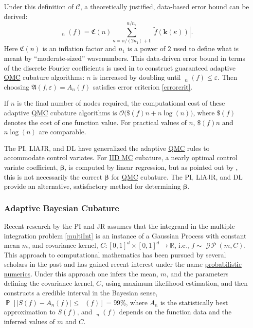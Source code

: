 \documentclass[11pt]{NSFamsart}
\newcommand{\QMC}{\hyperlink{QMClink}{QMC}\xspace}
\newcommand{\IIDMC}{\hyperlink{IIDMClink}{IID MC}\xspace}
\newcommand{\tf}{\widetilde{f}}
\DeclareMathOperator{\GP}{\mathcal{G} \! \mathcal{P}}
\newcommand{\reals}{{\mathbb{R}}}
\DeclareMathOperator{\err}{err}
\DeclareMathOperator{\herr}{\widehat{\err}}
\newcommand{\bk}{{\boldsymbol{k}}}
\newcommand{\bg}{{\boldsymbol{g}}}
\newcommand{\bbeta}{{\boldsymbol{\beta}}}
\newcommand{\cc}{\mathcal{C}}
\newcommand{\fA}{\mathfrak{A}}
\newcommand{\fC}{\mathfrak{C}}
\DeclareMathOperator{\Prob}{\mathbb{P}}
\def\abs#1{\ensuremath{\left \lvert #1 \right \rvert}}
\newcommand{\Order}{\mathcal{O}}
\begin{document}
Under this definition of $\cc$, a 
theoretically justified, data-based error bound can be derived:
\begin{equation*}
\herr_n(f) = \fC(n) \sum_{\kappa = n/(2n_1) + 1}^{n/n_1} \abs{\tf(\bk(\kappa))}.
\end{equation*}
Here $\fC(n)$ is an inflation factor and $n_1$ is a power of $2$ used to define what is meant by 
``moderate-sized'' wavenumbers.  This data-driven error bound in terms of the discrete Fourier 
coefficients is used in \cite{HicJim16a,JimHic16a} to construct guaranteed adaptive \QMC cubature 
algorithms: $n$ is increased by doubling until $\herr_n(f) \le \varepsilon$.  Then choosing 
$\fA(f,\varepsilon) = A_n(f)$ satisfies  error criterion 
\eqref{errorcrit}.  

If $n$ is the final number of nodes required, the computational cost of these adaptive \QMC 
cubature algorithms  is $\Order\bigl(\$(f)n + n \log(n)\bigr)$, 
where $\$(f)$ denotes the cost of one function value.  For practical values of $n$,  $\$(f)n$ and 
$n \log(n)$ are comparable.

The PI, LlAJR, and DL have generalized the adaptive \QMC rules to accommodate control variates.  
For \IIDMC cubature, a nearly optimal control variate coefficient, $\bbeta$, is 
computed by linear regression, but as pointed out by \cite{HicEtal03}, this is not necessarily the 
correct $\bbeta$ for \QMC cubature.  The PI, LlAJR, and DL provide an alternative, satisfactory 
method for 
determining $\bbeta$.

\subsubsection{Adaptive Bayesian Cubature}  \label{Bayessect} Recent research by the PI and 
JR assumes
that the integrand in the multiple integration problem \eqref{multiInt} is an instance of a Gaussian 
Process with constant mean $m$, and covariance kernel, $C:[0,1]^d \times [0,1]^d \to \reals$, i.e., 
$f \sim \GP (m,C)$.  This approach to computational mathematics has been pursued by several 
scholars in the past \cite{Dia88a, OHa91a, RasGha03a, Rit00a} and has gained recent interest 
under the name \href{http://www.probabilistic-numerics.org}{probabilistic numerics}.  Under this 
approach one 
infers the mean, $m$, and the parameters defining the covariance kernel, $C$, using maximum 
likelihood estimation, and then constructs a credible interval in the Bayesian sense, $\Prob[\abs{S(f) 
- A_n(f)} \le \herr(f)] = 99\%$, where $A_n$ is the statistically best approximation to $S(f)$, and 
$\herr_n(f)$ depends on the function data and the inferred values of $m$ and $C$. 
\end{document}
